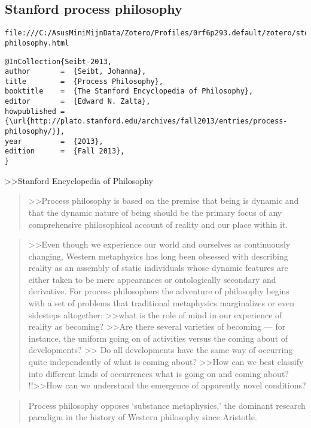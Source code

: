 \documentclass[a4paper]{Thesis}
\begin{document}
\subsection{Stanford process philosophy}
\begin{verbatim}
file:///C:/AsusMiniMijnData/Zotero/Profiles/0rf6p293.default/zotero/storage/TRSB7DQH/process-philosophy.html
\end{verbatim}


\begin{verbatim}
@InCollection{Seibt-2013,
author       =	{Seibt, Johanna},
title        =	{Process Philosophy},
booktitle    =	{The Stanford Encyclopedia of Philosophy},
editor       =	{Edward N. Zalta},
howpublished =	{\url{http://plato.stanford.edu/archives/fall2013/entries/process-philosophy/}},
year         =	{2013},
edition      =	{Fall 2013},
}
\end{verbatim}


>>Stanford Encyclopedia of Philosophy
\begin{quotation}
	>>Process philosophy is based on the premise that being is dynamic and that the dynamic nature of being should be the primary focus of any comprehensive philosophical account of reality and our place within it. 
\end{quotation}

\begin{quotation}
	>>Even though we experience our world and ourselves as continuously changing, Western metaphysics has long been obsessed with describing reality as an assembly of static individuals whose dynamic features are either taken to be mere appearances or ontologically secondary and derivative. 
	For process philosophers the adventure of philosophy begins with a set of problems that traditional metaphysics marginalizes or even sidesteps altogether: 
	>>what is the role of mind in our experience of reality as becoming? 
	>>Are there several varieties of becoming — for instance, the uniform going on of activities versus the coming about of developments? 
	>> Do all developments have the same way of occurring quite independently of what is coming about? 
	>>How can we best classify into different kinds of occurrences what is going on and coming about? 
	!!>>How can we understand the emergence of apparently novel conditions?
	
\end{quotation}

\begin{quotation}
	Process philosophy opposes ‘substance metaphysics,’ the dominant research paradigm in the history of Western philosophy since Aristotle.
\end{quotation}
\end{document}
